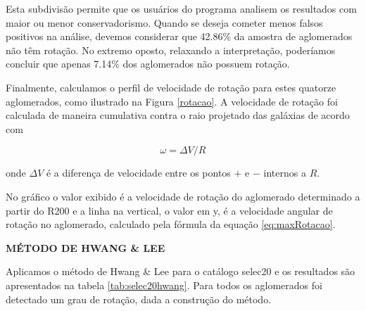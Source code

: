 \noindent Esta subdivisão permite que os usuários do programa analisem os resultados com maior ou menor conservadorismo.
Quando se deseja cometer menos falsos positivos na análise, devemos considerar que 42.86\% da amostra de aglomerados não têm rotação.
No extremo oposto, relaxando a interpretação, poderíamos concluir que apenas 7.14\% dos aglomerados não possuem rotação.

Finalmente, calculamos o perfil de velocidade de rotação para estes quatorze aglomerados, como ilustrado na Figura \ref{rotacao}. A velocidade de rotação foi calculada de maneira cumulativa contra o raio projetado das galáxias de acordo com

\begin{equation}
\omega= \Delta V/R
\label{eq:eq10}
\end{equation}

\noindent onde $\Delta V$ é a diferença de velocidade entre os pontos $+$ e $-$ internos a $R$.

No gráfico o valor exibido é a velocidade de rotação do aglomerado determinado a partir do R200 e a linha na vertical, o valor em y, é a velocidade angular de rotação no aglomerado, calculado pela fórmula da equação \ref{eq:maxRotacao}. 

\textbf{MÉTODO DE HWANG \& LEE}

Aplicamos o método de Hwang \& Lee para o catálogo selec20 e os resultados são apresentados na tabela \ref{tab:selec20hwang}. Para todos os aglomerados foi detectado um grau de rotação, dada a construção do método.

